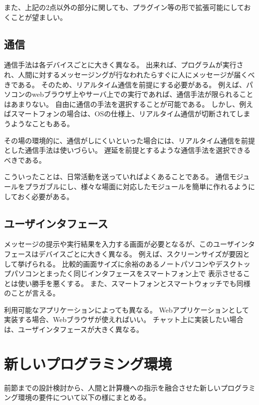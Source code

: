 また、上記の2点以外の部分に関しても、プラグイン等の形で拡張可能にしておくことが望ましい。

\subsection{通信}\label{ux901aux4fe1}

通信手法は各デバイスごとに大きく異なる。
出来れば、プログラムが実行され、人間に対するメッセージングが行なわれたらすぐに人にメッセージが届くべきである。
そのため、リアルタイム通信を前提にする必要がある。
例えば、パソコンのwebブラウザ上やサーバ上での実行であれば、通信手法が限られることはあまりない。
自由に通信の手法を選択することが可能である。
しかし、例えばスマートフォンの場合は、OSの仕様上、リアルタイム通信が切断されてしまうようなこともある。

その場の環境的に、通信がしにくいといった場合には、リアルタイム通信を前提とした通信手法は使いづらい。
遅延を前提とするような通信手法を選択できるべきである。

こういったことは、日常活動を送っていればよくあることである。
通信モジュールをプラガブルにし、様々な場面に対応したモジュールを簡単に作れるようにしておく必要がある。

\subsection{ユーザインタフェース}\label{ux30e6ux30fcux30b6ux30a4ux30f3ux30bfux30d5ux30a7ux30fcux30b9}

メッセージの提示や実行結果を入力する画面が必要となるが、このユーザインタフェースはデバイスごとに大きく異なる。
例えば、スクリーンサイズが要因として挙げられる。
比較的画面サイズに余裕のあるノートパソコンやデスクトップパソコンとまったく同じインタフェースをスマートフォン上で
表示させることは使い勝手を悪くする。
また、スマートフォンとスマートウォッチでも同様のことが言える。

利用可能なアプリケーションによっても異なる。
Webアプリケーションとして実装する場合、Webブラウザが使えればいい。
チャット上に実装したい場合は、ユーザインタフェースが大きく異なる。

\section{新しいプログラミング環境}\label{ux65b0ux3057ux3044ux30d7ux30edux30b0ux30e9ux30dfux30f3ux30b0ux74b0ux5883}

前節までの設計検討から、人間と計算機への指示を融合させた新しいプログラミング環境の要件について以下の様にまとめる。

